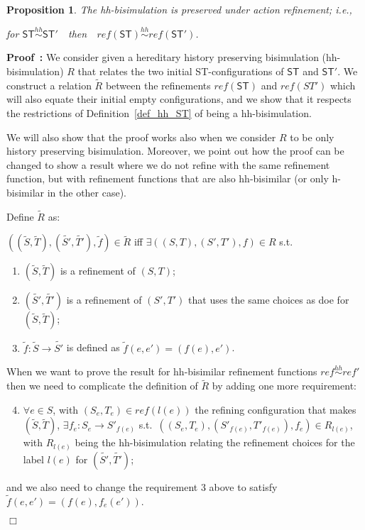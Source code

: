 \documentclass[submission,copyright,creativecommons]{eptcs}
\newtheorem{proposition}[theorem]{Proposition}
\newenvironment{proof}[1][\!\!\,]{\vspace{1ex}\noindent\textbf{Proof #1: }}{\hfill$\Box$\vspace{2ex}}
\newcounter{case}
\newcommand\ST{\ensuremath{\mathsf{ST}}}
\newcommand\reffun{\ensuremath{\mathit{ref}}}
\newcommand\refinement[1]{\ensuremath{\widetilde{#1}}}
\newcommand\hhequiv{\ensuremath{\stackrel{hh}{\sim}}}
\begin{document}
\begin{proposition}\label{prop_hhPreserved}
The hh-bisimulation is preserved under action refinement; i.e., 

\centerline{for $\ST\hhequiv\ST'$\ \ then\ \ $\reffun(\ST)\hhequiv\reffun(\ST')$.}
\end{proposition}


\begin{proof}
We consider given a hereditary history preserving bisimulation (hh-bisimulation) $R$ that relates the two initial ST-configurations of $\ST$ and $\ST'$. We construct a relation $\refinement{R}$ between the refinements $\reffun(\ST)$ and $\reffun(ST')$ which will also equate their initial empty configurations, and we show that it respects the restrictions of Definition~\ref{def_hh_ST} of being a hh-bisimulation.

We will also show that the proof works also when we consider $R$ to be only history preserving bisimulation. Moreover, we point out how the proof can be changed to show a result where we do not refine with the same refinement function, but with refinement functions that are also hh-bisimilar (or only h-bisimilar in the other case).

Define $\refinement{R}$ as:

$((\refinement{S},\refinement{T}),(\refinement{S'},\refinement{T'}),\refinement{f})\in\refinement{R}$ iff $\exists ((S,T),(S',T'),f)\in R$ s.t.
\begin{enumerate}
\item $(\refinement{S},\refinement{T})$ is a refinement of $(S,T)$;

\item $(\refinement{S'},\refinement{T'})$ is a refinement of $(S',T')$ that uses the same choices as doe for $(\refinement{S},\refinement{T})$;

\item $\refinement{f}:\refinement{S}\rightarrow \refinement{S'}$ is defined as $\refinement{f}(e,e')=(f(e),e')$.
\end{enumerate}

When we want to prove the result for hh-bisimilar refinement functions $\reffun\hhequiv\reffun'$ then we need to complicate the definition of $\refinement{R}$ by adding one more requirement:
\begin{enumerate}
\setcounter{enumi}{3}
\item $\forall e\in S$, with $(S_{e},T_{e})\in\reffun(l(e))$ the refining configuration that makes $(\refinement{S},\refinement{T})$, $\exists f_{e}:S_{e}\rightarrow S'_{f(e)}$ s.t.\ $((S_{e},T_{e}),(S'_{f(e)},T'_{f(e)}),f_{e})\in R_{l(e)}$, with $R_{l(e)}$ being the hh-bisimulation relating the refinement choices for the label $l(e)$ for $(\refinement{S'},\refinement{T'})$;
\end{enumerate}
and we also need to change the requirement 3 above to satisfy $\refinement{f}(e,e')=(f(e),f_{e}(e'))$.


\end{proof}
\end{document}
